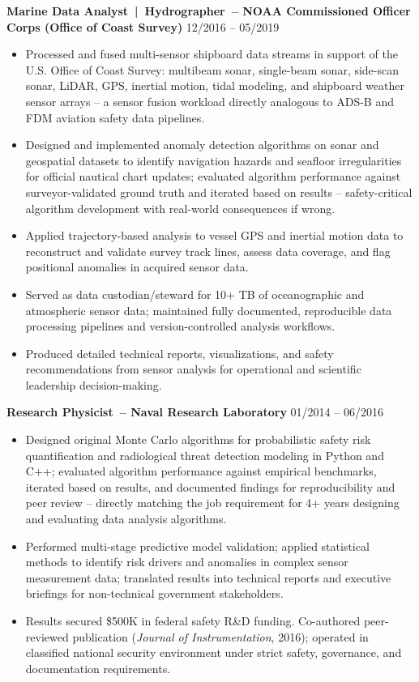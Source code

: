 \documentclass[10pt,letterpaper]{moderncv}
\begin{document}
\textbf{Marine Data Analyst~|~Hydrographer~-- NOAA Commissioned Officer Corps (Office of Coast Survey)} \hfill 12/2016 -- 05/2019
\vspace*{-2mm}
\begin{itemize}[label={-}, itemsep=-1.0ex]
  \item Processed and fused multi-sensor shipboard data streams in support of the U.S. Office of Coast Survey: multibeam sonar, single-beam sonar, side-scan sonar, LiDAR, GPS, inertial motion, tidal modeling, and shipboard weather sensor arrays -- a sensor fusion workload directly analogous to ADS-B and FDM aviation safety data pipelines.
  \item Designed and implemented anomaly detection algorithms on sonar and geospatial datasets to identify navigation hazards and seafloor irregularities for official nautical chart updates; evaluated algorithm performance against surveyor-validated ground truth and iterated based on results -- safety-critical algorithm development with real-world consequences if wrong.
  \item Applied trajectory-based analysis to vessel GPS and inertial motion data to reconstruct and validate survey track lines, assess data coverage, and flag positional anomalies in acquired sensor data.
  \item Served as data custodian/steward for 10+ TB of oceanographic and atmospheric sensor data; maintained fully documented, reproducible data processing pipelines and version-controlled analysis workflows.
  \item Produced detailed technical reports, visualizations, and safety recommendations from sensor analysis for operational and scientific leadership decision-making.
\end{itemize}

\textbf{Research Physicist~-- Naval Research Laboratory} \hfill 01/2014 -- 06/2016
\vspace*{-2mm}
\begin{itemize}[label={-}, itemsep=-1.0ex]
  \item Designed original Monte Carlo algorithms for probabilistic safety risk quantification and radiological threat detection modeling in Python and C++; evaluated algorithm performance against empirical benchmarks, iterated based on results, and documented findings for reproducibility and peer review -- directly matching the job requirement for 4+ years designing and evaluating data analysis algorithms.
  \item Performed multi-stage predictive model validation; applied statistical methods to identify risk drivers and anomalies in complex sensor measurement data; translated results into technical reports and executive briefings for non-technical government stakeholders.
  \item Results secured \$500K in federal safety R\&D funding. Co-authored peer-reviewed publication (\textit{Journal of Instrumentation}, 2016); operated in classified national security environment under strict safety, governance, and documentation requirements.
\end{itemize}
\end{document}
